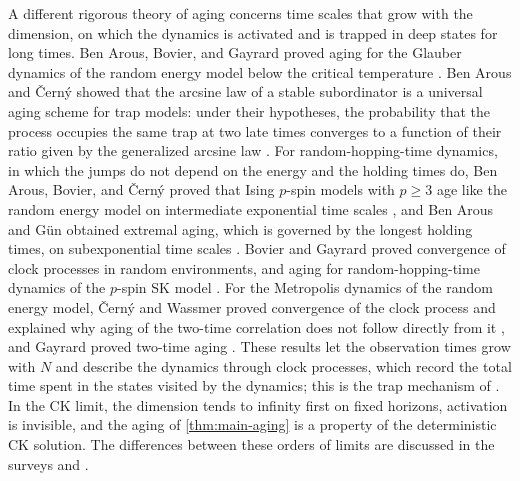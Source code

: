 A different rigorous theory of aging concerns time scales that grow with the dimension, on which the dynamics is activated and is trapped in deep states for long times. Ben Arous, Bovier, and Gayrard proved aging for the Glauber dynamics of the random energy model below the critical temperature \cite{bbg2003a,bbg2003b}. Ben Arous and \v{C}ern\'y showed that the arcsine law of a stable subordinator is a universal aging scheme for trap models: under their hypotheses, the probability that the process occupies the same trap at two late times converges to a function of their ratio given by the generalized arcsine law \cite{bc2008}. For random-hopping-time dynamics, in which the jumps do not depend on the energy and the holding times do, Ben Arous, Bovier, and \v{C}ern\'y proved that Ising $p$-spin models with $p\ge3$ age like the random energy model on intermediate exponential time scales \cite{bbc2008}, and Ben Arous and G\"un obtained extremal aging, which is governed by the longest holding times, on subexponential time scales \cite{bg2012}. Bovier and Gayrard proved convergence of clock processes in random environments, and aging for random-hopping-time dynamics of the $p$-spin SK model \cite{boviergayrard2013}. For the Metropolis dynamics of the random energy model, \v{C}ern\'y and Wassmer proved convergence of the clock process and explained why aging of the two-time correlation does not follow directly from it \cite[Theorem~1.1 and Remark~1.2(3)]{cw2017}, and Gayrard proved two-time aging \cite{gayrard2019}. These results let the observation times grow with $N$ and describe the dynamics through clock processes, which record the total time spent in the states visited by the dynamics; this is the trap mechanism of \cite{bouchaud1992}. In the CK limit, the dimension tends to infinity first on fixed horizons, activation is invisible, and the aging of \cref{thm:main-aging} is a property of the deterministic CK solution. The differences between these orders of limits are discussed in the surveys \cite{ba2002,bc2006} and \cite[pp.~120--121]{guionnet2007}.


